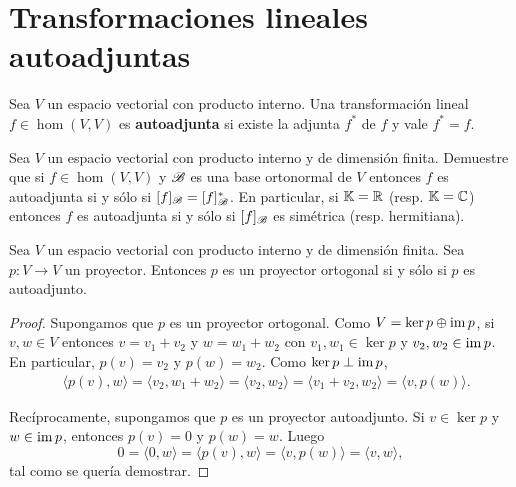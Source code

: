 \section{Transformaciones lineales autoadjuntas}

\begin{block}
	\label{Transformación lineal!autoadjunta}
	Sea $V$ un espacio vectorial con producto interno. Una transformación
	lineal $f\in\hom(V,V)$ es \textbf{autoadjunta} si existe la adjunta $f^*$
	de $f$ y vale $f^*=f$. 
\end{block}

\begin{xca}
	\label{xca:autoadjunta}
	Sea $V$ un espacio vectorial con producto interno y de dimensión finita.
	Demuestre que si $f\in\hom(V,V)$ y $\mathscr{B}$ es una base ortonormal de $V$
	entonces $f$ es autoadjunta si y sólo si $[f]_{\mathscr{B}}=[f]_{\mathscr{B}}^*$. En
	particular, si $\mathbb{K}=\mathbb{R}$ (resp. $\mathbb{K}=\mathbb{C}$) entonces $f$ es autoadjunta si y
	sólo si $[f]_{\mathscr{B}}$ es simétrica (resp. hermitiana).
\end{xca}

\begin{prop}
	Sea $V$ un espacio vectorial con producto interno y de dimensión finita.
	Sea $p\colon V\to V$ un proyector.  Entonces $p$ es un proyector ortogonal
	si y sólo si $p$ es autoadjunto.

	\begin{proof}
		Supongamos que $p$ es un proyector ortogonal. Como $V=\ker p\oplus \operatorname{im} p$, 
		si $v,w\in V$ entonces $v=v_1+v_2$ y $w=w_1+w_2$ con
		$v_1,w_1\in\ker p$ y $v_2,w_2\in\operatorname{im} p$. En particular, $p(v)=v_2$ y
		$p(w)=w_2$. Como $\ker p\perp\operatorname{im} p$, 
		\begin{align*}
			&\langle p(v),w\rangle=\langle v_2,w_1+w_2\rangle=\langle v_2,w_2\rangle
			=\langle v_1+v_2,w_2\rangle=\langle v,p(w)\rangle.
		\end{align*}
		
		Recíprocamente, supongamos que $p$ es un proyector autoadjunto. Si $v\in\ker p$ y
		$w\in\operatorname{im} p$, entonces $p(v)=0$ y $p(w)=w$. Luego
		\[
			0=\langle 0,w\rangle=\langle p(v),w\rangle=\langle v,p(w)\rangle=\langle v,w\rangle,
		\]
		tal como se quería demostrar.
	\end{proof}
\end{prop}


